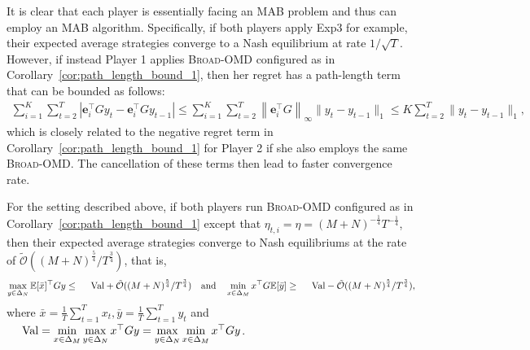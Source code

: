 It is clear that each player is essentially facing an MAB problem and thus can employ an MAB algorithm.
Specifically, if both players apply Exp3 for example, their expected average strategies converge to a Nash equilibrium at rate $1/\sqrt{T}$.
However, if instead Player 1 applies \textsc{Broad-OMD} configured as in Corollary~\ref{cor:path_length_bound_1},
then her regret has a path-length term that can be bounded as follows:
\begin{align*}
\sum_{i=1}^K \sum_{t=2}^T\left| \mathbf{e}_{i}^\top Gy_t -  \mathbf{e}_{i}^\top Gy_{t-1}\right|
\leq \sum_{i=1}^K \sum_{t=2}^T\left\| \mathbf{e}_{i}^\top G \right\|_\infty \|y_t - y_{t-1}\|_1 \leq K \sum_{t=2}^T \|y_t - y_{t-1}\|_1,
\end{align*}
which is closely related to the negative regret term in Corollary~\ref{cor:path_length_bound_1}
for Player 2 if she also employs the same \textsc{Broad-OMD}.
The cancellation of these terms then lead to faster convergence rate.

\begin{theorem}
\label{thm:fast_convergence_theorem}
For the setting described above, if both players run \textsc{Broad-OMD} configured as in Corollary~\ref{cor:path_length_bound_1} except that $\eta_{t,i}=\eta= (M+N)^{-\frac{1}{4}}T^{-\frac{1}{4}}$, then their expected average strategies converge to Nash equilibriums at the rate of $\tilde{\mathcal{O}}\left((M+N)^{\frac{5}{4}}/T^{\frac{3}{4}}\right)$, that is,
\begin{align*}
\max_{y\in \Delta_N} \mathbb{E}[\bar{x}]^\top Gy \leq \text{\rm Val} + \tilde{\mathcal{O}}((M+N)^{\frac{5}{4}}/T^{\frac{3}{4}}) \quad\text{and}\quad
\min_{x\in \Delta_M}x^\top G\mathbb{E}[\bar{y}] \geq \text{\rm Val} - \tilde{\mathcal{O}}((M+N)^{\frac{5}{4}}/T^{\frac{3}{4}}),
\end{align*}
where $\bar{x}=\frac{1}{T}\sum_{t=1}^T x_t, \bar{y}=\frac{1}{T}\sum_{t=1}^T y_t$ and 
$\text{\rm Val}= \min\limits_{x\in \Delta_M}\max\limits_{y\in \Delta_N} x^\top Gy = \max\limits_{y\in \Delta_N}\min\limits_{x\in \Delta_M} x^\top Gy$.
\end{theorem}

